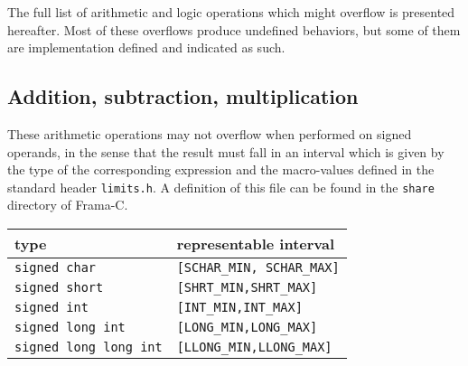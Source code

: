 The full list of arithmetic and logic operations which might overflow is
presented hereafter.  Most of these overflows produce undefined behaviors, but
some of them are implementation defined and indicated as such.

\subsection{Addition, subtraction, multiplication}

These arithmetic operations may not overflow when performed on signed operands,
in the sense that the result must fall in an interval which is given by the type
of the corresponding expression and the macro-values defined in the standard
header \lstinline|limits.h|.  A definition of this file can be found in the
\lstinline|share| directory of Frama-C.

\medskip

\begin{center}
\begin{tabular}{|l|l|}
\hline
type & representable interval \\
\hline
\lstinline|signed char| & \lstinline|[SCHAR_MIN, SCHAR_MAX]|  \\
\lstinline|signed short| & \lstinline|[SHRT_MIN,SHRT_MAX]| \\
\lstinline|signed int| & \lstinline|[INT_MIN,INT_MAX]| \\
\lstinline|signed long int| & \lstinline|[LONG_MIN,LONG_MAX]| \\
\lstinline|signed long long int| & \lstinline|[LLONG_MIN,LLONG_MAX]| \\
\hline
\end{tabular}
\end{center}

\medskip

